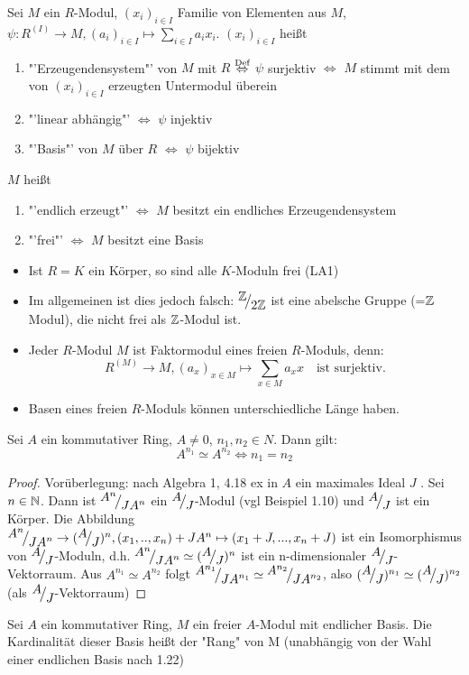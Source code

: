 \begin{df}
	Sei $M$ ein $R$-Modul, $(x_i)_{i \in I} $ Familie von Elementen aus $M$, $\psi:R^{(I)} \to M, (a_i)_{i \in I} \mapsto \sum_{i\in I}a_ix_i$.
	$(x_i)_{i \in I} $ heißt 
	\begin{enumerate}
		\item[] "'Erzeugendensystem"' von $M$ mit $R$ $\overset{\text{Def}}{\Leftrightarrow}$  $\psi $ surjektiv $\Longleftrightarrow$ $M$ stimmt mit dem von $(x_i)_{i \in I} $ erzeugten Untermodul überein
		\item[]	"'linear abhängig"' $\Longleftrightarrow$ $\psi $ injektiv 
		\item[] "'Basis"' von $M$ über $R$ $\Longleftrightarrow$ $\psi$ bijektiv 
	\end{enumerate}
	$M$ heißt
	\begin{enumerate}
		\item[]	 "'endlich erzeugt"' $\Longleftrightarrow$ $M$ besitzt ein endliches Erzeugendensystem 
		\item[] "'frei"' $\Longleftrightarrow$ $M$ besitzt eine Basis
	\end{enumerate}
\end{df}
\begin{anm}
	\begin{itemize}
		\item Ist $R=K$ ein Körper, so sind alle $K$-Moduln frei (LA1)
		\item Im allgemeinen ist dies jedoch falsch: $\QR{\Z}{2\Z} $ ist eine abelsche Gruppe (=$\mathbb{Z}$ Modul), die nicht frei als $\mathbb{Z}$-Modul ist.
		\item Jeder $R$-Modul $M$ ist Faktormodul eines freien $R$-Moduls, denn: $$ R^{(M)} \to M, (a_x)_{ x \in M} \mapsto \sum_{x\in M}a_{x}x \quad \text{ist surjektiv}.$$
		\item Basen eines freien $R$-Moduls können unterschiedliche Länge haben.
	\end{itemize}
\end{anm}
\begin{sa}
	Sei $A$ ein kommutativer Ring, $A \neq 0$, $n_1,n_2 \in N $. Dann gilt: \\
	$$ A^{n_1} \simeq A^{n_2} \Longleftrightarrow n_1 =n_2 $$
\end{sa}
\begin{proof}
	Vorüberlegung: nach Algebra 1, 4.18 ex in $A$ ein maximales Ideal $J$ . Sei $n \in \mathbb{N}$. Dann ist $\QR{A^{n}}{JA^{n}}$ ein $\QR{A}{J}$-Modul (vgl Beispiel 1.10) und $\QR{A}{J}$ ist ein Körper. Die Abbildung $\QR{A^{n}}{JA^{n}} \to (\QR{A}{J})^{n}, (x_1,..,x_n) +JA^{n} \mapsto (x_1+J,...,x_n+J) $ ist ein Isomorphismus von $\QR{A}{J}$-Moduln, d.h. $\QR{A^{n}}{JA^{n}} \simeq (\QR{A}{J})^{n} $ ist ein n-dimensionaler $\QR{A}{J}$-Vektorraum. Aus $ A^{n_1} \simeq A^{n_2}$ folgt $\QR{A^{n_1}}{JA^{n_1}} \simeq \QR{A^{n_2}}{JA^{n_2}}$, also $ (\QR{A}{J})^{n_1} \simeq (\QR{A}{J})^{n_2}$ (als $\QR{A}{J}$-Vektorraum)
\end{proof}
\begin{df}
	Sei $A$ ein kommutativer Ring, $M$ ein freier $A$-Modul mit endlicher Basis. Die Kardinalität dieser Basis heißt der "Rang" von M (unabhängig von der Wahl einer endlichen Basis nach 1.22)
\end{df}
\newpage

